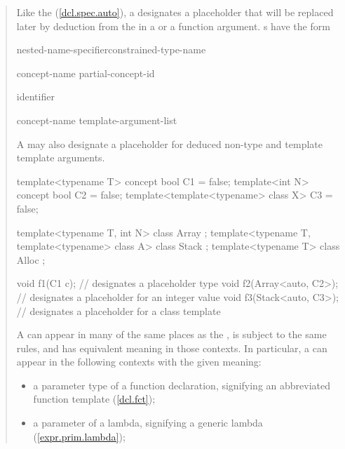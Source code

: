 \begin{quote}

\pnum
Like the   (\ref{dcl.spec.auto}),
a  designates a placeholder that 
will be replaced later by deduction from the  in a
 or a function argument.
% 
s have
the form

\begin{bnf}
\br
		nested-name-specifier\opt constrained-type-name

\br
  concept-name\br
  partial-concept-id

\br
  identifier

\br
		concept-name \terminal{<} template-argument-list\opt \terminal{>}
\end{bnf}

A 
may also designate a placeholder for deduced non-type and template 
template arguments.
% 
\enterexample
\begin{codeblock}
template<typename T> concept bool C1 = false;
template<int N> concept bool C2 = false;
template<template<typename> class X> C3 = false;

template<typename T, int N> class Array { };
template<typename T, template<typename> class A> class Stack { };
template<typename T> class Alloc { };

void f1(C1 c);            //  designates a placeholder type
void f2(Array<auto, C2>); //  designates a placeholder for an integer value
void f3(Stack<auto, C3>); //  designates a placeholder for a class template
\end{codeblock}
\exitexample


A 
can appear in many of the same places as the 
, is subject
to the same rules, and has equivalent meaning in those contexts. 
In particular, a  
can appear in the following contexts with the given meaning:
% 
\begin{itemize}
\item a parameter type of a function declaration, signifying an 
     abbreviated function template (\ref{dcl.fct});

\item a parameter of a lambda, signifying a generic lambda 
     (\ref{expr.prim.lambda});


\end{itemize}
\end{quote}
